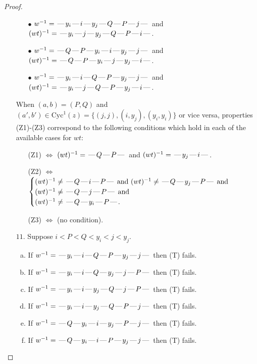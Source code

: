 \documentclass[10pt]{article}
\theoremstyle{definition}
\theoremstyle{definition}
\def\dash{\text{\hspace{0.5mm}---\hspace{0.5mm}}}
\def\Cyc{\mathrm{Cyc}}
\begin{document}
\begin{proof}
\begin{enumerate}
\begin{enumerate}
\item[$\bullet$] $w^{-1} = \dash y_i\dash i\dash y_j\dash Q\dash P\dash j\dash $ and $(wt)^{-1} = \dash y_i\dash j\dash y_j\dash Q\dash P\dash i\dash $.
\item[$\bullet$] $w^{-1} = \dash Q\dash P\dash y_i\dash i\dash y_j\dash j\dash $ and $(wt)^{-1} = \dash Q\dash P\dash y_i\dash j\dash y_j\dash i\dash $.
\item[$\bullet$] $w^{-1} = \dash y_i\dash i\dash Q\dash P\dash y_j\dash j\dash $ and $(wt)^{-1} = \dash y_i\dash j\dash Q\dash P\dash y_j\dash i\dash $.
\end{enumerate}
When $(a,b)= (P,Q)$ and $(a',b')\in \Cyc^1(z)=\{(j,j),(i,y_j),(y_i,y_i)\}$ or vice versa,
properties (Z1)-(Z3) correspond to the following conditions which
hold in each of the available cases for $wt$:
\begin{enumerate}
\item[](Z1) $\Leftrightarrow$ $(wt)^{-1} = \dash Q \dash P \dash$  and $(wt)^{-1} = \dash y_j \dash i \dash$.
\item[](Z2) $\Leftrightarrow$ $\begin{cases}\text{$(wt)^{-1} \neq \dash Q \dash i \dash P \dash$ and $(wt)^{-1}\neq \dash Q \dash y_j \dash P \dash$}\text{ and }\\
\text{$(wt)^{-1} \neq \dash Q \dash j \dash P \dash$}\text{ and }\\
\text{$(wt)^{-1} \neq \dash Q \dash y_i \dash P \dash$}.\end{cases}$
\item[](Z3) $\Leftrightarrow$ (no condition).
\end{enumerate}
\item[$11$.] Suppose $i < P < Q < y_i < j < y_j$.
\begin{enumerate}[(a)]
\item If $w^{-1} = \dash y_i\dash i\dash Q\dash P\dash y_j\dash j\dash $ then (T) fails.
\item If $w^{-1} = \dash y_i\dash i\dash Q\dash y_j\dash j\dash P\dash $ then (T) fails.
\item If $w^{-1} = \dash y_i\dash i\dash y_j\dash Q\dash j\dash P\dash $ then (T) fails.
\item If $w^{-1} = \dash y_i\dash i\dash y_j\dash Q\dash P\dash j\dash $ then (T) fails.
\item If $w^{-1} = \dash Q\dash y_i\dash i\dash y_j\dash P\dash j\dash $ then (T) fails.
\item If $w^{-1} = \dash Q\dash y_i\dash i\dash P\dash y_j\dash j\dash $ then (T) fails.

\end{enumerate}
\end{enumerate}
\end{proof}
\end{document}
